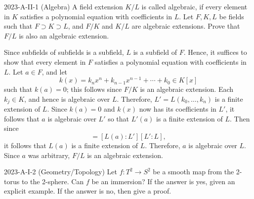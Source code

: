 \documentclass{article}
\begin{document}
\begin{prb}{2023-A-II-1 (Algebra)}
	A field extension $K/L$ is called algebraic, if every element in $K$ satisfies a polynomial equation with coefficients in $L$. Let $F, K, L$ be fields such that $F \supset K \supset L$, and $F/K$ and $K/L$ are algebraic extensions. Prove that $F/L$ is also an algebraic extension. 
\end{prb}
\begin{solutions}
	Since subfields of subfields is a subfield, $L$ is a subfield of $F$. Hence, it suffices to show that every element in $F$ satisfies a polynomial equation with coefficients in $L$. Let $a \in F$, and let 
	\begin{equation}
		k(x) = k_{n}x^{n} + k_{n - 1}x^{n-1} + \dotsm + k_{0} \in K[x]
	\end{equation}
	such that $k(a) = 0$; this follows since $F/K$ is an algebraic extension. Each $k_{j} \in K$, and hence is algebraic over $L$. Therefore, $L' = L(k_{0}, \ldots, k_{n})$ is a finite extension of $L$. Since $k(a) = 0$ and $k(x)$ now has its coefficients in $L'$, it follows that $a$ is algebraic over $L'$ so that $L'(a)$ is a finite extension of $L$. Then since 
	\begin{equation}
		[L(a):L] = [L(a):L'][L':L], 
	\end{equation}
	it follows that $L(a)$ is a finite extension of $L$. Therefore, $a$ is algebraic over $L$. Since $a$ was arbitrary, $F/L$ is an algebraic extension. 
\end{solutions}
\begin{prb}{2023-A-I-2 (Geometry/Topology)}
	Let $f: T^{2} \to S^{2}$ be a smooth map from the 2-torus to the 2-sphere. Can $f$ be an immersion? If the answer is yes, given an explicit example. If the answer is no, then give a proof. 
\end{prb}
\end{document}
